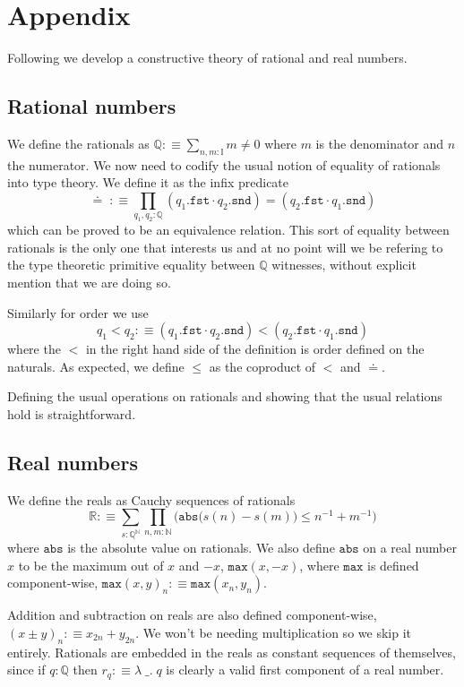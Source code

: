 \documentclass[12pt]{report}
\theoremstyle{definition}
\begin{document}

\chapter*{Appendix}
Following \cite{bridges_richman_1987_2} we develop a constructive theory of rational and real numbers.
\section{Rational numbers}
We define the rationals as $\mathbb{Q} :\equiv \sum_{n,m: \mathbb{I}}m \neq 0$ where $m$ is the denominator and $n$ the numerator. 
We now need to codify the usual notion of equality of rationals into type theory. 
We define it as the infix predicate
$$\doteq\; :\equiv \prod_{q_1, q_2 : \mathbb{Q}} (q_1.\mathtt{fst} \cdot q_2.\mathtt{snd}) = (q_2.\mathtt{fst} \cdot q_1.\mathtt{snd})$$
which can be proved to be an equivalence relation. 
This sort of equality between rationals is the only one that interests us and at no point will we be refering to the type theoretic primitive equality between $\mathbb{Q}$ witnesses, without explicit mention that we are doing so. 

Similarly for order we use 
$$q_1 < q_2 :\equiv (q_1.\mathtt{fst} \cdot q_2.\mathtt{snd}) < (q_2.\mathtt{fst} \cdot q_1.\mathtt{snd})$$ 
where the $<$ in the right hand side of the definition is order defined on the naturals. 
As expected, we define $\leq$ as the coproduct of $<$ and $\doteq$. 

Defining the usual operations on rationals and showing that the usual relations hold is straightforward. 

\section{Real numbers}
We define the reals as Cauchy sequences of rationals
$$\mathbb{R} :\equiv \sum_{s: \mathbb{Q}^\mathbb{N}}\prod_{n,m : \mathbb{N}} \Big( \mathtt{abs}\big(s(n) - s(m) \big) \leq n^{-1} + m^{-1} \Big)$$
where $\mathtt{abs}$ is the absolute value on rationals. 
We also define $\mathtt{abs}$ on a real number $x$ to be the maximum out of $x$ and $-x$, $\mathtt{max}(x,-x)$, where $\mathtt{max}$ is defined component-wise, $\mathtt{max}(x,y)_n :\equiv \mathtt{max}(x_n,y_n)$. 

Addition and subtraction on reals are also defined component-wise, $(x \pm y)_n :\equiv x_{2n} + y_{2n}$. 
We won't be needing multiplication so we skip it entirely. 
Rationals are embedded in the reals as constant sequences of themselves, since if $q : \mathbb{Q}$ then $r_q :\equiv \lambda\;\_.\; q$ is clearly a valid first component of a real number. 
\end{document}
